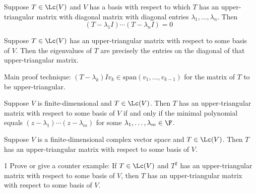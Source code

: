 \documentclass{extarticle}
\begin{document}
\begin{lemma}
    Suppose \(T \in \Lc(V)\) and \(V\) has a basis with respect to which \(T\) has an upper-triangular matrix 
    with diagonal matrix with diagonal entries \(\lambda_1, \ldots, \lambda_n\). Then 
    \[(T - \lambda_1 I) \cdots (T - \lambda_n I) = 0\]
\end{lemma}

\begin{thm}
    Suppose \(T \in \Lc(V)\) has an upper-triangular matrix with respect to some 
    basis of \(V\). Then the eigenvalues of \(T\) are precisely the entries on the diagonal 
    of that upper-triangular matrix. 
\end{thm}

\begin{remark}
    Main proof technique: \((T - \lambda_k)I v_k \in \text{span}(v_1, \ldots, v_{k-1})\) for the matrix 
    of \(T\) to be upper-triangular. 
\end{remark}


\begin{lemma}
    Suppose \(V\) is finite-dimensional and \(T \in \Lc(V)\). Then \(T\) has an upper-triangular matrix 
    with respect to some basis of \(V\) if and only if the minimal polynomial equals 
    \((z - \lambda_1)\cdots(z - \lambda_m)\) for some \(\lambda_1, \ldots, \lambda_m \in \F\).
\end{lemma}

\begin{thm}[if \(\F = \C\), then every operator on \(V\) has an upper-triangular matrix]
    Suppose \(V\) is a finite-dimensional complex vector space and \(T \in \Lc(V)\). Then \(T\) 
    has an upper-triangular matrix with respect to some basis of \(V\).
\end{thm}


\newpage 
{}

\begin{problem}{1}
    Prove or give a counter example: If \(T \in \Lc(V)\) and \(T^2\) has an upper-triangular matrix with 
    respect to some basis of \(V\), then \(T\) has an upper-triangular matrix with respect to some basis 
    of \(V\).
\end{problem}
\end{document}
